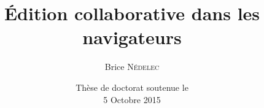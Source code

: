 \documentclass[10pt, xcolor={usenames, dvipsnames}]{beamer}
\title{Édition collaborative dans les navigateurs}
\author{Brice \textsc{N\'edelec}}
\institute{\normalsize{Université de Nantes, LINA}}
\date{Thèse de doctorat soutenue le\\5 Octobre 2015}
\begin{document}
  \begin{frame}
    \titlepage
  \end{frame}

  \begin{frame}
  \end{frame}
\end{document}
